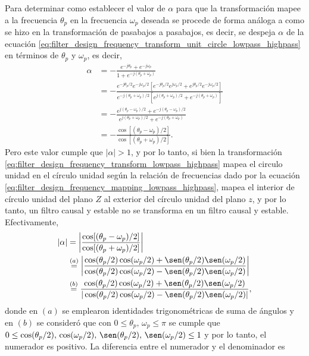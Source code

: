 \documentclass[a4paper]{report}
\begin{document}
Para determinar como establecer el valor de \(\alpha\) para que la transformación mapee a la frecuencia \(\theta_p\) en la frecuencia \(\omega_p\) deseada se procede  de forma análoga a como se hizo en la transformación de pasabajos a pasabajos, es decir, se despeja \(\alpha\) de la ecuación \ref{eq:filter_design_frequency_transform_unit_circle_lowpass_highpass} en términos de \(\theta_p\) y \(\omega_p\), es decir, 
\begin{align*}
 \alpha&=-\frac{e^{-j\theta_p}+e^{-j\omega_p}}{1+e^{-j(\theta_p+\omega_p)}}\\
   &=-\frac{e^{-j\theta_p/2}e^{-j\omega_p/2}\left[e^{-j\theta_p/2}e^{j\omega_p/2}+e^{j\theta_p/2}e^{-j\omega_p/2}\right]}{e^{-j(\theta_p+\omega_p)/2}\left[e^{j(\theta_p+\omega_p)/2}+e^{-j(\theta_p+\omega_p)}\right]}\\
   &=-\frac{e^{j(\theta_p-\omega_p)/2}+e^{-j(\theta_p-\omega_p)/2}}{e^{j(\theta_p+\omega_p)/2}+e^{-j(\theta_p+\omega_p)}}\\
   &=-\frac{\cos[(\theta_p-\omega_p)/2]}{\cos[(\theta_p+\omega_p)/2]}.
\end{align*}
Pero este valor cumple que \(|\alpha|>1\), y por lo tanto, si bien la transformación \ref{eq:filter_design_frequency_transform_lowpass_highpass} mapea el circulo unidad en el círculo unidad según la relación de frecuencias dado por la ecuación \ref{eq:filter_design_frequency_mapping_lowpass_highpass}, mapea el interior de círculo unidad del plano \(Z\) al exterior del círculo unidad del plano \(z\), y por lo tanto, un filtro causal y estable no se transforma en un filtro causal y estable. Efectivamente,
\begin{align*}
 |\alpha|&=\left|\frac{\cos[(\theta_p-\omega_p)/2]}{\cos[(\theta_p+\omega_p)/2]}\right|\\
  &\overset{(a)}{=}\left|\frac{\cos(\theta_p/2)\cos(\omega_p/2)+\sen(\theta_p/2)\sen(\omega_p/2)}{\cos(\theta_p/2)\cos(\omega_p/2)-\sen(\theta_p/2)\sen(\omega_p/2)}\right|\\
  &\overset{(b)}{=}\frac{\cos(\theta_p/2)\cos(\omega_p/2)+\sen(\theta_p/2)\sen(\omega_p/2)}{|\cos(\theta_p/2)\cos(\omega_p/2)-\sen(\theta_p/2)\sen(\omega_p/2)|},
\end{align*}
donde en \((a)\) se emplearon identidades trigonométricas de suma de ángulos y en \((b)\) se consideró que con \(0\leq\theta_p,\,\omega_p\leq\pi\) se cumple que \(0\leq\cos(\theta_p/2),\,\cos(\omega_p/2),\,\sen(\theta_p/2),\,\sen(\omega_p/2)\leq1\) y por lo tanto, el numerador es positivo. La diferencia entre el numerador y el denominador es
\end{document}
